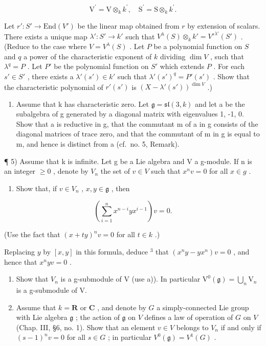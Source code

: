 \[
\mathrm{V} ^ {\prime} = \mathrm{V} \otimes_ {k} k ^ {\prime}, \quad \mathrm{S} ^ {\prime} = \mathrm{S} \otimes_ {k} k ^ {\prime}.
\]

Let \(r' : S' \to \text{End}(V')\) be the linear map obtained from \(r\) by extension of scalars. There exists a unique map \(\lambda' : S' \to k'\) such that \(V^{\lambda}(S) \otimes_k k' = V'^{\lambda'}(S')\) . (Reduce to the case where \(V = V^{\lambda}(S)\) . Let \(P\) be a polynomial function on \(S\) and \(q\) a power of the characteristic exponent of \(k\) dividing \(\dim V\) , such that \(\lambda^q = P\) . Let \(P'\) be the polynomial function on \(S'\) which extends \(P\) . For each \(s' \in S'\) , there exists a \(\lambda'(s') \in k'\) such that \(\lambda'(s')^q = P'(s')\) . Show that the characteristic polynomial of \(r'(s')\) is \((X - \lambda'(s'))^{\dim V}\) .)

\begin{enumerate}
\def\labelenumi{\arabic{enumi})}
\setcounter{enumi}{3}
\tightlist
\item
  Assume that k has characteristic zero. Let \(\mathfrak{g} = \mathfrak{sl}(3, k)\) and let a be the subalgebra of g generated by a diagonal matrix with eigenvalues 1, -1, 0. Show that a is reductive in g, that the commutant m of a in g consists of the diagonal matrices of trace zero, and that the commutant of m in g is equal to m, and hence is distinct from a (cf.~no. 5, Remark).
\end{enumerate}

¶ 5) Assume that k is infinite. Let g be a Lie algebra and V a g-module. If n is an integer \(\geq 0\) , denote by \(V_{n}\) the set of \(v \in V\) such that \(x^{n}v = 0\) for all \(x \in g\) .

\begin{enumerate}
\def\labelenumi{\alph{enumi})}
\tightlist
\item
  Show that, if \(v \in V_n\) , \(x, y \in \mathfrak{g}\) , then
\end{enumerate}

\[
\left(\sum_ {i = 1} ^ {n} x ^ {n - i} y x ^ {i - 1}\right) v = 0.
\]

(Use the fact that \((x + ty)^n v = 0\) for all \(t\in k\) .)

Replacing \(y\) by \([x, y]\) in this formula, deduce \(^3\) that \((x^n y - y x^n)v = 0\) , and hence that \(x^n y v = 0\) .

\begin{enumerate}
\def\labelenumi{\alph{enumi})}
\setcounter{enumi}{1}
\item
  Show that \(V_{n}\) is a g-submodule of V (use a)). In particular \(\mathrm{V}^{0}(\mathfrak{g})=\bigcup_{n}\mathrm{V}_{n}\) is a g-submodule of V.
\item
  Assume that \(k = \mathbf{R}\) or \(\mathbf{C}\) , and denote by \(G\) a simply-connected Lie group with Lie algebra \(\mathfrak{g}\) ; the action of \(\mathfrak{g}\) on \(V\) defines a law of operation of \(G\) on \(V\) (Chap. III, §6, no. 1). Show that an element \(v \in V\) belongs to \(V_n\) if and only if \((s - 1)^n v = 0\) for all \(s \in G\) ; in particular \(V^0(\mathfrak{g}) = V^1(G)\) .
\end{enumerate}

